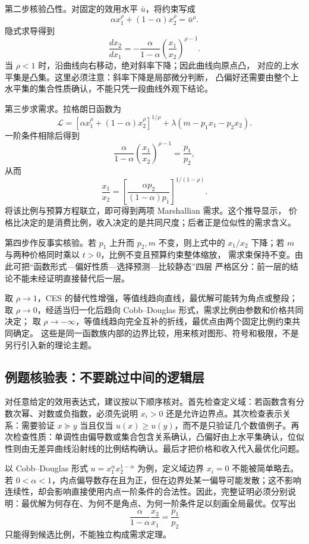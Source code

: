 第二步核验凸性。对固定的效用水平 $\bar u$，将约束写成
\[
 \alpha x_1^\rho+(1-\alpha)x_2^\rho=\bar u^\rho.
\]
隐式求导得到
\[
 \frac{dx_2}{dx_1}
 =-\frac{\alpha}{1-\alpha}
   \left(\frac{x_1}{x_2}\right)^{\rho-1}.
\]
当 $\rho<1$ 时，沿曲线向右移动，绝对斜率下降；因此曲线向原点凸，
对应的上水平集是凸集。这里必须注意：斜率下降是局部微分判断，
凸偏好还需要由整个上水平集的集合性质确认，不能只凭一段曲线外观下结论。

第三步求需求。拉格朗日函数为
\[
 \mathcal L=\left[\alpha x_1^\rho+(1-\alpha)x_2^\rho\right]^{1/\rho}
 +\lambda(m-p_1x_1-p_2x_2).
\]
一阶条件相除后得到
\[
 \frac{\alpha}{1-\alpha}\left(\frac{x_1}{x_2}\right)^{\rho-1}
 =\frac{p_1}{p_2},
\]
从而
\[
 \frac{x_1}{x_2}
 =\left[\frac{\alpha p_2}{(1-\alpha)p_1}\right]^{1/(1-\rho)}.
\]
将该比例与预算方程联立，即可得到两项 Marshallian 需求。这个推导显示，
价格比决定的是消费比例，收入决定的是共同尺度；后者正是位似性的需求含义。

第四步作反事实核验。若 $p_1$ 上升而 $p_2,m$ 不变，则上式中的 $x_1/x_2$
下降；若 $m$ 与两种价格同时乘以 $t>0$，比例不变且预算约束整体缩放，
需求束保持不变。由此可把“函数形式—偏好性质—选择预测—比较静态”四层
严格区分：前一层的结论不能未经证明直接替代后一层。

\begin{example}
取 $\rho\to1$，CES 的替代性增强，等值线趋向直线，最优解可能转为角点或整段；
取 $\rho\to0$，经适当归一化后趋向 Cobb--Douglas 形式，需求比例由参数和价格共同决定；
取 $\rho\to-\infty$，等值线趋向完全互补的折线，最优点由两个固定比例约束共同确定。
这些是同一函数族内部的边界比较，用来核对图形、符号和极限，不是另行引入新的理论主题。
\end{example}

\subsection{例题核验表：不要跳过中间的逻辑层}
对任意给定的效用表达式，建议按以下顺序核对。首先检查定义域：若函数含有分数次幂、对数或负指数，必须先说明 $x_i>0$ 还是允许边界点。其次检查表示关系：需要验证 $x\succeq y$ 当且仅当 $u(x)\ge u(y)$，而不是只验证几个数值例子。再次检查性质：单调性由偏导数或集合包含关系确认，凸偏好由上水平集确认，位似性则由无差异曲线沿射线的比例结构确认。最后才把价格和收入代入最优化问题。

以 Cobb--Douglas 形式 $u=x_1^\alpha x_2^{1-\alpha}$ 为例，定义域边界 $x_i=0$ 不能被简单略去。若 $0<\alpha<1$，内点偏导数存在且为正，但在边界处某一偏导可能发散；这不影响连续性，却会影响直接使用内点一阶条件的合法性。因此，完整证明必须分别说明：最优解为何存在、为何不是角点、为何一阶条件足以刻画全局最优。仅写出
\[
\frac{\alpha}{1-\alpha}\frac{x_2}{x_1}=\frac{p_1}{p_2}
\]
只能得到候选比例，不能独立构成需求定理。

